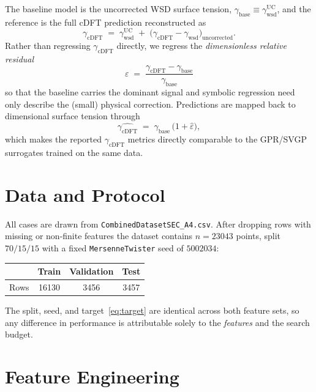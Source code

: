 \documentclass[11pt]{article}
\newcommand{\eps}{\varepsilon}
\newcommand{\gcDFT}{\gamma_{\mathrm{cDFT}}}
\newcommand{\gbase}{\gamma_{\mathrm{base}}}
\begin{document}
The baseline model is the uncorrected WSD surface tension,
$\gbase\equiv\gamma_{\mathrm{wsd}}^{\mathrm{UC}}$, and the reference is the
full cDFT prediction reconstructed as
\begin{equation}
  \gcDFT \;=\; \gamma_{\mathrm{wsd}}^{\mathrm{UC}}
  \;+\;\bigl(\gamma_{\mathrm{cDFT}}-\gamma_{\mathrm{wsd}}\bigr)_{\!\mathrm{uncorrected}} .
\end{equation}
Rather than regressing $\gcDFT$ directly, we regress the
\emph{dimensionless relative residual}
\begin{equation}
  \boxed{\;\eps \;=\; \frac{\gcDFT-\gbase}{\gbase}\;}
  \label{eq:target}
\end{equation}
so that the baseline carries the dominant signal and symbolic regression
need only describe the (small) physical correction. Predictions are mapped
back to dimensional surface tension through
\begin{equation}
  \widehat{\gcDFT} \;=\; \gbase\,\bigl(1+\widehat{\eps}\bigr),
  \label{eq:reconstruct}
\end{equation}
which makes the reported $\gcDFT$ metrics directly comparable to the
GPR/SVGP surrogates trained on the same data.

\section{Data and Protocol}

All cases are drawn from \texttt{CombinedDatasetSEC\_A4.csv}. After dropping
rows with missing or non-finite features the dataset contains
$n=\num{23043}$ points, split $70/15/15$ with a fixed
\texttt{MersenneTwister} seed of $5002034$:
\begin{center}
\begin{tabular}{lccc}
\toprule
 & Train & Validation & Test \\
\midrule
Rows & \num{16130} & \num{3456} & \num{3457} \\
\bottomrule
\end{tabular}
\end{center}
The split, seed, and target~\eqref{eq:target} are identical across both
feature sets, so any difference in performance is attributable solely to the
\emph{features} and the search budget.

\section{Feature Engineering}
\end{document}
